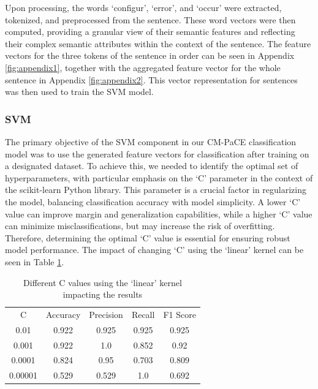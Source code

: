 \documentclass[english,bachelor]{swsLeipzig}
\begin{document}
Upon processing, the words `configur', `error', and `occur' were extracted, tokenized, and preprocessed 
from the sentence. These word vectors were then computed, providing a granular view of their semantic features and reflecting their complex semantic attributes within the context of the sentence. The feature vectors for the three tokens of the sentence in order can be seen in Appendix \ref{fig:appendix1}, together with the aggregated feature vector for the whole sentence in Appendix \ref{fig:appendix2}. This vector representation for sentences was then used to train the SVM model.

\subsubsection{SVM}

The primary objective of the SVM component in our CM-PaCE classification model was to use the generated feature vectors for classification after training on a designated dataset. To achieve this, we needed to identify the optimal set of hyperparameters, with particular emphasis on the `C' parameter in the context of the scikit-learn Python library. This parameter is a crucial factor in regularizing the model, balancing classification accuracy with model simplicity. A lower `C' value can improve margin and generalization capabilities, while a higher `C' value can minimize misclassifications, but may increase the risk of overfitting. Therefore, determining the optimal `C' value is essential for ensuring robust model performance. The impact of changing `C' using the `linear' kernel can be seen in Table \ref{tab:table50}.\\

\begin{table}[ht]
  \caption{Different C values using the `linear' kernel impacting the results}
  \centering
  \begin{tabular}{ccccc}\toprule
  C & Accuracy & Precision & Recall & F1 Score \\ \cmidrule(l){2-5}
  0.01    & 0.922       & 0.925       & 0.925 & 0.925 \\
  0.001  & 0.922  & 1.0  & 0.852 & 0.92 \\
  0.0001  & 0.824       & 0.95       & 0.703 & 0.809 \\
  0.00001    & 0.529       & 0.529       & 1.0 & 0.692 \\\bottomrule
  \end{tabular}
  \label{tab:table50}
\end{table}
\end{document}
